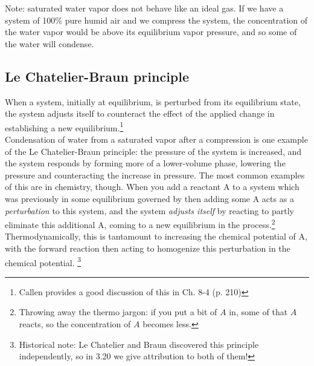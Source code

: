 \documentclass[12pt]{article}
\begin{document}
Note: saturated water vapor does not behave like an ideal gas. If we have a system of 100\% pure humid air and we compress the system, the concentration of the water vapor would be above its equilibrium vapor pressure, and so some of the water will condense. %


\subsection{Le Chatelier-Braun principle}
 When a system, initially at equilibrium, is perturbed from its equilibrium state, the system adjusts itself to counteract the effect of the applied change in establishing a new equilibrium.\footnote{Callen provides a good discussion of this in Ch. 8-4 (p. 210)}\\

Condensation of water from a saturated vapor after a compression is one example of the Le Chatelier-Braun principle: the pressure of the system is increased, and the system responds by forming more of a lower-volume phase, lowering the pressure and counteracting the increase in pressure. The most common examples of this are in chemistry, though.  When you add a reactant A to a system which was previously in some equilibrium governed by
\eqs{}\eqe
then adding some A acts as a \emph{ perturbation} to this system, and the system \emph{ adjusts itself} by reacting to partly eliminate this additional A, coming to a new equilibrium in the process.\footnote{Throwing away the thermo jargon: if you put a bit of $A$ in, some of that $A$ reacts, so the concentration of $A$ becomes less.} Thermodynamically, this is tantamount to increasing the chemical potential of A, with the forward reaction
then acting to homogenize this perturbation in the chemical potential. \footnote{Historical note: Le Chatelier and Braun discovered this principle independently, so in 3.20 we give attribution to both of them!}
\end{document}
